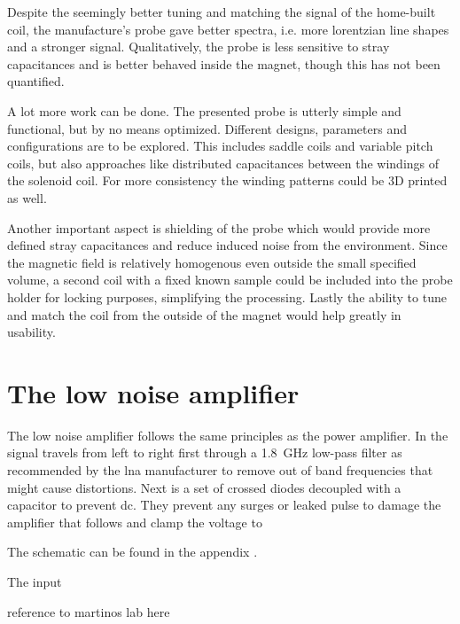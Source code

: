 Despite the seemingly better tuning and matching the signal of the home-built coil, the manufacture's probe gave better spectra, i.e. more lorentzian line shapes and a stronger signal. Qualitatively, the probe is less sensitive to stray capacitances and is better behaved inside the magnet, though this has not been quantified.

A lot more work can be done. The presented probe is utterly simple and functional, but by no means optimized. Different designs, parameters and configurations are to be explored. This includes saddle coils and variable pitch coils, but also approaches like distributed capacitances between the windings of the solenoid coil. For more consistency the winding patterns could be 3D printed as well.

Another important aspect is shielding of the probe which would provide more defined stray capacitances and reduce induced noise from the environment. Since the magnetic field is relatively homogenous even outside the small specified volume, a second coil with a fixed known sample could be included into the probe holder for locking purposes, simplifying the processing. Lastly the ability to tune and match the coil from the outside of the magnet would help greatly in usability.

\section{The low noise amplifier}

The low noise amplifier follows the same principles as the power amplifier. In  the signal travels from left to right first through a \qty{1.8}{\giga\hertz} low-pass filter as recommended by the \acrshort{lna} manufacturer to remove out of band frequencies that might cause distortions. Next is a set of crossed diodes decoupled with a capacitor to prevent \acrshort{dc}. They prevent any surges or leaked pulse to damage the amplifier that follows and clamp the voltage to \

The schematic can be found in the appendix .

The input


reference to martinos lab here

